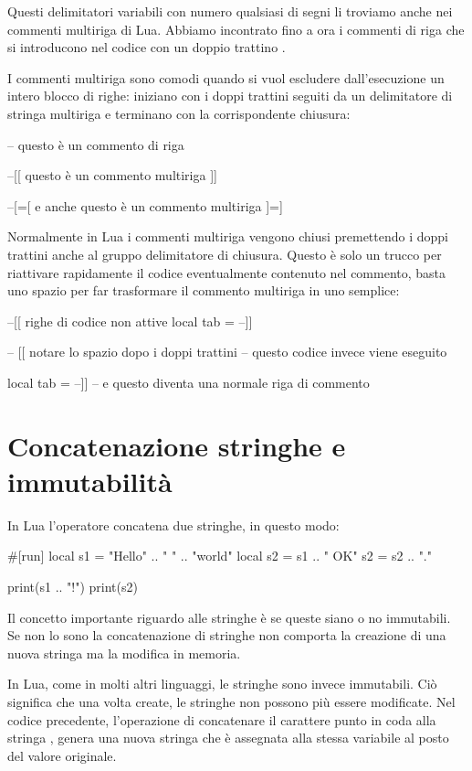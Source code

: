 Questi delimitatori variabili con numero qualsiasi di segni \key{=} li troviamo
anche nei commenti multiriga di Lua. Abbiamo incontrato fino a ora i commenti di
riga che si introducono nel codice con un doppio trattino \key{--}.

I commenti multiriga sono comodi quando si vuol escludere dall'esecuzione un
intero blocco di righe: iniziano con i doppi trattini seguiti da un delimitatore
di stringa multiriga e terminano con la corrispondente chiusura:
\begin{lines}
-- questo è un commento di riga

--[[
questo è un commento
multiriga
]]

--[=[
e anche questo è un commento
multiriga
]=]
\end{lines}

Normalmente in Lua i commenti multiriga vengono chiusi premettendo i doppi
trattini anche al gruppo delimitatore di chiusura. Questo è solo un trucco per
riattivare rapidamente il codice eventualmente contenuto nel commento, basta uno
spazio per far trasformare il commento multiriga in uno semplice:
\begin{lines}
--[[ righe di codice non attive
local tab = {}
--]]

-- [[ notare lo spazio dopo i doppi trattini
-- questo codice invece viene eseguito

local tab = {}
--]] -- e questo diventa una normale riga di commento
\end{lines}


\section{Concatenazione stringhe e immutabilità}

In Lua l'operatore  concatena due stringhe, in questo modo:
\begin{lines}
#[run]
local s1 = "Hello" .. " " .. "world"
local s2 = s1 .. " OK"
s2 = s2 .. "."

print(s1 .. "!")
print(s2)
\end{lines}

Il concetto importante riguardo alle stringhe è se queste siano o no immutabili.
Se non lo sono la concatenazione di stringhe non comporta la creazione di una
nuova stringa ma la modifica in memoria.

In Lua, come in molti altri linguaggi, le stringhe sono invece immutabili. Ciò
significa che una volta create, le stringhe non possono più essere modificate.
Nel codice precedente, l'operazione di concatenare il carattere punto in coda
alla stringa , genera una nuova stringa che è assegnata alla stessa
variabile al posto del valore originale.

